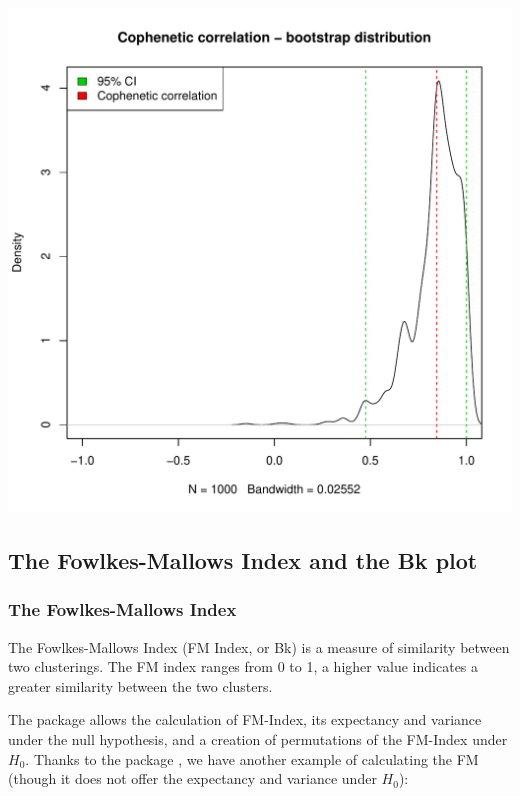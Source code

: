 \documentclass[shortnames,nojss,article]{jss}\usepackage[]{graphicx}\usepackage[]{color}
\makeatletter
\def\maxwidth{ %
  \ifdim\Gin@nat@width>\linewidth
    \linewidth
  \else
    \Gin@nat@width
  \fi
}
\newenvironment{knitrout}{}{} %
\makeatother
\begin{document}
\begin{knitrout}
{\centering \includegraphics[width=\maxwidth]{figure/cor_cophenetic_simulation_CI_4} 

}



\end{knitrout}





\subsection{The Fowlkes-Mallows Index and the Bk plot}

\subsubsection{The Fowlkes-Mallows Index}

The Fowlkes-Mallows Index \citep{fowlkes1983method} (FM Index, or Bk) is a measure of similarity between two clusterings. The FM index ranges from 0 to 1, a higher value indicates a greater similarity between the two clusters.

The  package allows the calculation of FM-Index, its expectancy and variance under the null hypothesis, and a creation of permutations of the FM-Index under $H_0$. Thanks to the  package \citep{CRAN:profdpm}, we have another example of calculating the FM (though it does not offer the expectancy and variance under $H_0$):
\end{document}
